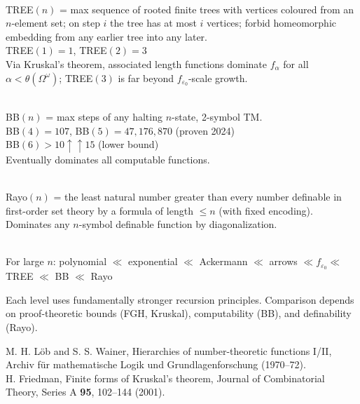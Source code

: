 \begin{technical}
\\
TREE$(n)$ = max sequence of rooted finite trees with vertices coloured from an $n$-element set; on step $i$ the tree has at most $i$ vertices; forbid homeomorphic embedding from any earlier tree into any later.\\
TREE$(1) = 1$, TREE$(2) = 3$\\
Via Kruskal's theorem, associated length functions dominate $f_\alpha$ for all $\alpha<\theta(\Omega^\omega)$; TREE$(3)$ is far beyond $f_{\varepsilon_0}$-scale growth.

\\
BB$(n)$ = max steps of any halting $n$-state, 2-symbol TM.\\
BB$(4) = 107$, BB$(5) = 47{,}176{,}870$ (proven 2024)\\
BB$(6) > 10\uparrow\uparrow 15$ (lower bound)\\
Eventually dominates all computable functions.

\\
Rayo$(n)$ = the least natural number greater than every number definable in first-order set theory by a formula of length $\leq n$ (with fixed encoding).\\
Dominates any $n$-symbol definable function by diagonalization.

\\
For large $n$: polynomial $\ll$ exponential $\ll$ Ackermann $\ll$ arrows $\ll f_{\varepsilon_0} \ll$ TREE $\ll$ BB $\ll$ Rayo

Each level uses fundamentally stronger recursion principles. Comparison depends on proof-theoretic bounds (FGH, Kruskal), computability (BB), and definability (Rayo).

\techref
{\footnotesize
M. H. Löb and S. S. Wainer, \QSOpen{}Hierarchies of number-theoretic functions I/II,\QSClose{} Archiv für mathematische Logik und Grundlagenforschung (1970–72).\\
H. Friedman, \QSOpen{}Finite forms of Kruskal's theorem,\QSClose{} Journal of Combinatorial Theory, Series A \textbf{95}, 102–144 (2001).
}
\end{technical}